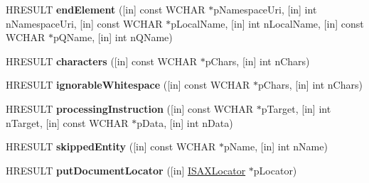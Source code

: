 \begin{DoxyCompactItemize}
\item 
\mbox{\label{interface_m_s_x_m_l2_1_1_i_s_a_x_content_handler_a1d200519c5037d0089f04bbe765d4e7d}} 
H\+R\+E\+S\+U\+LT {\bfseries end\+Element} (\mbox{[}in\mbox{]} const W\+C\+H\+AR $\ast$p\+Namespace\+Uri, \mbox{[}in\mbox{]} int n\+Namespace\+Uri, \mbox{[}in\mbox{]} const W\+C\+H\+AR $\ast$p\+Local\+Name, \mbox{[}in\mbox{]} int n\+Local\+Name, \mbox{[}in\mbox{]} const W\+C\+H\+AR $\ast$p\+Q\+Name, \mbox{[}in\mbox{]} int n\+Q\+Name)
\item 
\mbox{\label{interface_m_s_x_m_l2_1_1_i_s_a_x_content_handler_a214ac446e1ccb60654436865920cf5df}} 
H\+R\+E\+S\+U\+LT {\bfseries characters} (\mbox{[}in\mbox{]} const W\+C\+H\+AR $\ast$p\+Chars, \mbox{[}in\mbox{]} int n\+Chars)
\item 
\mbox{\label{interface_m_s_x_m_l2_1_1_i_s_a_x_content_handler_a231a97139131cdd6d2b2873b7efc240b}} 
H\+R\+E\+S\+U\+LT {\bfseries ignorable\+Whitespace} (\mbox{[}in\mbox{]} const W\+C\+H\+AR $\ast$p\+Chars, \mbox{[}in\mbox{]} int n\+Chars)
\item 
\mbox{\label{interface_m_s_x_m_l2_1_1_i_s_a_x_content_handler_a1590f2579019195a60a47b6d699c1755}} 
H\+R\+E\+S\+U\+LT {\bfseries processing\+Instruction} (\mbox{[}in\mbox{]} const W\+C\+H\+AR $\ast$p\+Target, \mbox{[}in\mbox{]} int n\+Target, \mbox{[}in\mbox{]} const W\+C\+H\+AR $\ast$p\+Data, \mbox{[}in\mbox{]} int n\+Data)
\item 
\mbox{\label{interface_m_s_x_m_l2_1_1_i_s_a_x_content_handler_a9af221d80d179945179ee23a2d620e09}} 
H\+R\+E\+S\+U\+LT {\bfseries skipped\+Entity} (\mbox{[}in\mbox{]} const W\+C\+H\+AR $\ast$p\+Name, \mbox{[}in\mbox{]} int n\+Name)
\item 
\mbox{\label{interface_m_s_x_m_l2_1_1_i_s_a_x_content_handler_a0d24811b770d414786d4055913923d3d}} 
H\+R\+E\+S\+U\+LT {\bfseries put\+Document\+Locator} (\mbox{[}in\mbox{]} \hyperlink{interface_m_s_x_m_l2_1_1_i_s_a_x_locator}{I\+S\+A\+X\+Locator} $\ast$p\+Locator)
\item 

\end{DoxyCompactItemize}
